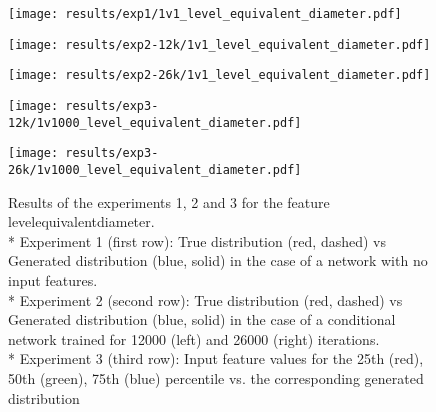 \begin{figure}[h!]
	\begin{minipage}{0.5\linewidth}
		\texttt{[image: results/exp1/1v1\_level\_equivalent\_diameter.pdf]}
	\end{minipage}
	
	\begin{minipage}{0.5\linewidth}
		\texttt{[image: results/exp2-12k/1v1\_level\_equivalent\_diameter.pdf]}
	\end{minipage}
	\begin{minipage}{0.5\linewidth}
		\texttt{[image: results/exp2-26k/1v1\_level\_equivalent\_diameter.pdf]}
	\end{minipage}
	
	\begin{minipage}{0.5\linewidth}
		\texttt{[image: results/exp3-12k/1v1000\_level\_equivalent\_diameter.pdf]}
	\end{minipage}
	\begin{minipage}{0.5\linewidth}
		\texttt{[image: results/exp3-26k/1v1000\_level\_equivalent\_diameter.pdf]}
	\end{minipage}
	\caption[ Results: Input feature level\textunderscore equivalent\textunderscore diameter]{ Results of the experiments 1, 2 and 3 for the feature level\textunderscore equivalent\textunderscore diameter. \\* Experiment 1 (first row): True distribution (red, dashed) vs Generated distribution (blue, solid) in the case of a network with no input features. \\* Experiment 2 (second row): True distribution (red, dashed) vs Generated distribution (blue, solid) in the case of a conditional network trained for 12000 (left) and 26000 (right) iterations. \\* Experiment 3 (third row): Input feature values for the 25th (red), 50th (green), 75th (blue) percentile vs. the corresponding generated distribution}
	\label{fig:results_level_equivalent_diameter}
\end{figure}
